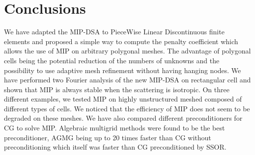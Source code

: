 \section{Conclusions} \label{sec_conc}
We have adapted the MIP-DSA to PieceWise Linear Discontinuous finite elements
and proposed a simple way to compute the penalty coefficient which allows the
use of MIP on arbitrary polygonal meshes. The advantage of polygonal cells 
being the potential reduction 
of the numbers of unknowns and the possibility to use adaptive mesh refinement 
without having hanging nodes. We have performed two Fourier analysis of the
new MIP-DSA on rectangular cell and shown that MIP is always stable when the
scattering is isotropic. On three different examples, we tested MIP on highly
unstructured meshed composed of different types of cells. We noticed that the
efficiency of MIP does not seem to be degraded on these meshes. We have also
compared different preconditioners for CG to solve MIP. Algebraic multigrid
methods were found to be the best preconditioner, AGMG being up to 20 times
faster than CG without preconditioning which itself was faster than CG
preconditioned by SSOR.

